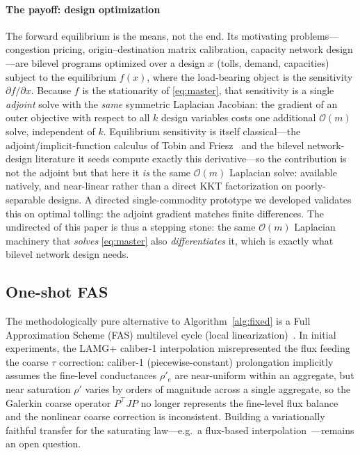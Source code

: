 \documentclass{siamart220329}
\newcommand{\Om}{\mathcal{O}(m)}
\begin{document}
\paragraph{The payoff: design optimization} The forward equilibrium is the means, not the end. Its
motivating problems---congestion pricing, origin--destination matrix calibration,
capacity network design---are bilevel programs optimized over a design $x$ (tolls, demand,
capacities) subject to the equilibrium $f(x)$, where the load-bearing object is the sensitivity
$\partial f/\partial x$. Because $f$ is the stationarity of \eqref{eq:master}, that sensitivity is a
single \emph{adjoint} solve with the \emph{same} symmetric Laplacian Jacobian: the gradient of an outer
objective with respect to all $k$ design variables costs one additional $\Om$ solve,
independent of $k$. Equilibrium sensitivity is itself classical---the adjoint/implicit-function
calculus of Tobin and Friesz~\cite{tobin-friesz} and the bilevel network-design literature it seeds
compute exactly this derivative---so the contribution is not the adjoint but that here it \emph{is} the
same $\Om$ Laplacian solve: available natively, and near-linear rather than a direct KKT factorization
on poorly-separable designs. A directed single-commodity prototype we developed validates this on
optimal tolling: the adjoint gradient matches finite differences. The undirected of this paper is thus a stepping stone: the same
$\Om$ Laplacian machinery that \emph{solves} \eqref{eq:master} also \emph{differentiates} it, which is
exactly what bilevel network design needs.

\subsection{One-shot FAS}\label{sec:fasfail}
The methodologically pure alternative to Algorithm~\ref{alg:fixed} is a Full Approximation Scheme (FAS) multilevel cycle (local linearization)~\cite{brandt-fas,brandt-guide}. In initial experiments, the LAMG+ caliber-1 interpolation misrepresented the flux feeding the coarse $\tau$ correction: caliber-1 (piecewise-constant) prolongation implicitly assumes the fine-level conductances $\rho'_e$ are near-uniform within an aggregate, but near saturation $\rho'$ varies by orders of magnitude across a single aggregate, so the Galerkin coarse operator $P^{\top}JP$ no longer represents the fine-level flux balance and the nonlinear coarse correction is inconsistent. Building a variationally faithful transfer for the saturating law---e.g.\ a flux-based interpolation~\cite[\S4.6]{brandt-guide}---remains an open question.
\end{document}
